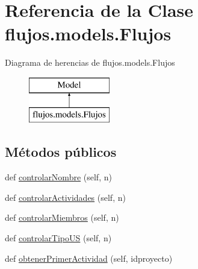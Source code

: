 \hypertarget{classflujos_1_1models_1_1_flujos}{}\section{Referencia de la Clase flujos.\+models.\+Flujos}
\label{classflujos_1_1models_1_1_flujos}
Diagrama de herencias de flujos.\+models.\+Flujos\begin{figure}[H]
\begin{center}
\leavevmode
\includegraphics[height=2.000000cm]{classflujos_1_1models_1_1_flujos}
\end{center}
\end{figure}
\subsection*{Métodos públicos}
\begin{DoxyCompactItemize}
\item 
def \hyperlink{classflujos_1_1models_1_1_flujos_a5b5a46d846e99662c866e30d51737ef1}{controlar\+Nombre} (self, n)
\item 
def \hyperlink{classflujos_1_1models_1_1_flujos_a31b2ca03ada70cb87e2cc3bbf5040702}{controlar\+Actividades} (self, n)
\item 
def \hyperlink{classflujos_1_1models_1_1_flujos_a73bf2e17276cd11c9663f7687c4ec58f}{controlar\+Miembros} (self, n)
\item 
def \hyperlink{classflujos_1_1models_1_1_flujos_ac834d94702394845f9ff1f4f621bc39d}{controlar\+Tipo\+US} (self, n)
\item 
def \hyperlink{classflujos_1_1models_1_1_flujos_a9852c685a8afe8c154d1fc0f426c5586}{obtener\+Primer\+Actividad} (self, idproyecto)
\end{DoxyCompactItemize}
